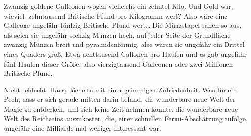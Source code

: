 Zwanzig goldene Galleonen wogen vielleicht ein zehntel Kilo. Und Gold war, wieviel, zehntausend Britische Pfund pro Kilogramm wert? Also wäre eine Galleone ungefähr fünfzig Britische Pfund wert… Die Münzstapel sahen so aus, als seien sie ungefähr sechzig Münzen hoch, auf jeder Seite der Grundfläche zwanzig Münzen breit und pyramidenförmig, also wären sie ungefähr ein Drittel eines Quaders groß. Etwa achttausend Gallonen pro Haufen und es gab ungefähr fünf Haufen dieser Größe, also vierzigtausend Galleonen oder zwei Millionen Britische Pfund.

Nicht schlecht. Harry lächelte mit einer grimmigen Zufriedenheit. Was für ein Pech, dass er sich gerade mitten darin befand, die wunderbare neue Welt der Magie zu entdecken, und sich keine Zeit nehmen konnte, die wunderbare neue Welt des Reichseins auszukosten, die, einer schnellen Fermi-Abschätzung zufolge, ungefähr eine Milliarde mal weniger interessant war.

